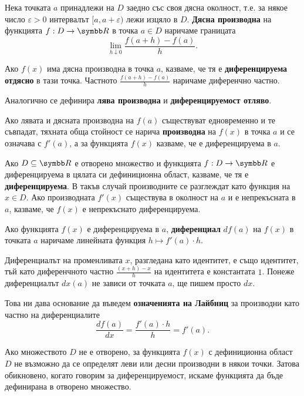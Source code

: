 \documentclass[numbers=endperiod, bibliography=totocnumbered]{scrartcl}
\begin{document}
\begin{definition}
  Нека точката \( a \) принадлежи на \( D \) заедно със своя дясна околност, т.е. за някое число \( \varepsilon > 0 \) интервалът \( [a, a + \varepsilon) \) лежи изцяло в \( D \). \textbf{Дясна производна} на функцията \( f: D \to \R \) в точка \( a \in D \) наричаме границата
  \begin{equation*}
    \lim_{h \downarrow 0} \frac {f(a + h) - f(a)} h.
  \end{equation*}

  Ако \( f(x) \) има дясна производна в точка \( a \), казваме, че тя е \textbf{диференцируема отдясно} в тази точка.
  Частното \( \frac {f(a + h) - f(a)} h \) наричаме диференчно частно.

  Аналогично се дефинира \textbf{лява производна} и \textbf{диференцируемост отляво}.

  Ако лявата и дясната производна на \( f(a) \) съществуват едновременно и те съвпадат, тяхната обща стойност се нарича \textbf{производна} на \( f(x) \) в точка \( a \) и се означава с \( f'(a) \), а за функцията \( f(x) \) казваме, че е диференцируема в \( a \).

  Ако \( D \subseteq \R \) е отворено множество и функцията \( f: D \to \R \) е диференцируема в цялата си дефиниционна област, казваме, че тя е \textbf{диференцируема}. В такъв случай производните се разглеждат като функция на \( x \in D \). Ако производната \( f'(x) \) съществува в околност на \( a \) и е непрекъсната в \( a \), казваме, че \( f(x) \) е непрекъснато диференцируема.

  Ако функцията \( f(x) \) е диференцируема в \( a \), \textbf{диференциал} \( df(a) \) на \( f(x) \) в точката \( a \) наричаме линейната функция \( h \mapsto f'(a) \cdot h \).

  Диференциалът на променливата \( x \), разгледана като идентитет, е също идентитет, тъй като диференчното частно \( \frac {(x + h) - x} h \) на идентитета е константата \( 1 \). Понеже диференциалът \( dx(a) \) не зависи от точката \( a \), ще пишем просто \( dx \).

  Това ни дава основание да въведем \textbf{означенията на Лайбниц} за производни като частно на диференциалите
  \begin{equation*}
    \frac {df(a)} {dx} = \frac {f'(a) \cdot h} h = f'(a).
  \end{equation*}
\end{definition}

\begin{remark}
  Ако множеството \( D \) не е отворено, за функцията \( f(x) \) с дефиниционна област \( D \) не възможно да се определят леви или десни производни в някои точки. Затова обикновено, когато говорим за диференцируемост, искаме функцията да бъде дефинирана в отворено множество.
\end{remark}
\end{document}
